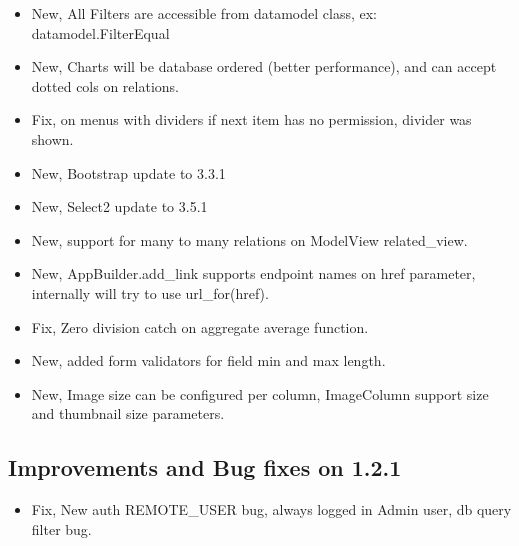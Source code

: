 \documentclass[letterpaper,10pt,english]{sphinxmanual}
\begin{document}
\begin{itemize}
\item {} 
New, All Filters are accessible from datamodel class, ex: datamodel.FilterEqual

\item {} 
New, Charts will be database ordered (better performance), and can accept dotted cols on relations.

\item {} 
Fix, on menus with dividers if next item has no permission, divider was shown.

\item {} 
New, Bootstrap update to 3.3.1

\item {} 
New, Select2 update to 3.5.1

\item {} 
New, support for many to many relations on ModelView related\_view.

\item {} 
New, AppBuilder.add\_link supports endpoint names on href parameter, internally will try to use url\_for(href).

\item {} 
Fix, Zero division catch on aggregate average function.

\item {} 
New, added form validators for field min and max length.

\item {} 
New, Image size can be configured per column, ImageColumn support size and thumbnail size parameters.

\end{itemize}


\subsection{Improvements and Bug fixes on 1.2.1}
\label{versions:improvements-and-bug-fixes-on-1-2-1}\begin{itemize}
\item {} 
Fix, New auth REMOTE\_USER bug, always logged in Admin user, db query filter bug.

\end{itemize}
\end{document}

